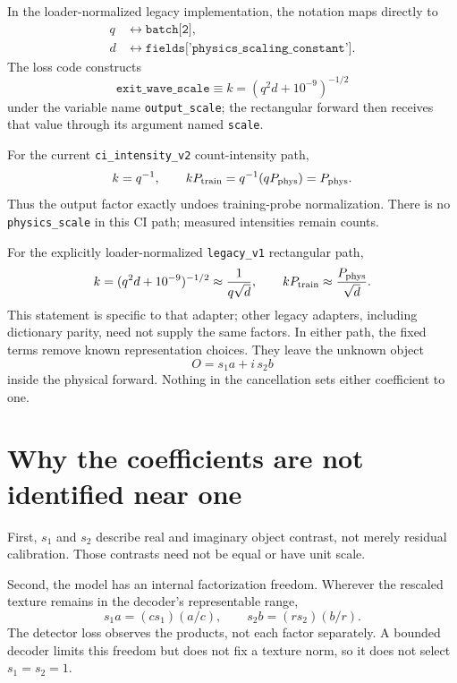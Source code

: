 \documentclass[10pt]{article}
\begin{document}
In the loader-normalized legacy implementation, the notation maps directly to
\begin{align*}
  q &\longleftrightarrow \texttt{batch[2]},\\
  d &\longleftrightarrow
      \texttt{fields['physics\_scaling\_constant']}.
\end{align*}
The loss code constructs
\begin{equation}
  \texttt{exit\_wave\_scale}
  \equiv k=(q^2d+10^{-9})^{-1/2}
\end{equation}
under the variable name \texttt{output\_scale}; the rectangular forward then
receives that value through its argument named \texttt{scale}.

For the current \texttt{ci\_intensity\_v2} count-intensity path,
\begin{equation}
  k=q^{-1}, \qquad kP_{\rm train}=q^{-1}(qP_{\rm phys})=P_{\rm phys}.
\end{equation}
Thus the output factor exactly undoes training-probe normalization. There is no
\texttt{physics\_scale} in this CI path; measured intensities remain counts.

For the explicitly loader-normalized \texttt{legacy\_v1} rectangular path,
\begin{equation}
  k=(q^2d+10^{-9})^{-1/2}
  \approx \frac{1}{q\sqrt d},
  \qquad kP_{\rm train}\approx\frac{P_{\rm phys}}{\sqrt d}.
\end{equation}
This statement is specific to that adapter; other legacy adapters, including
dictionary parity, need not supply the same factors. In either path, the fixed
terms remove known representation choices. They leave the unknown object
\begin{equation}
  O=s_1a+i\,s_2b
\end{equation}
inside the physical forward. Nothing in the cancellation sets either
coefficient to one.

\section*{Why the coefficients are not identified near one}

First, $s_1$ and $s_2$ describe real and imaginary object contrast, not merely
residual calibration. Those contrasts need not be equal or have unit scale.

Second, the model has an internal factorization freedom. Wherever the rescaled
texture remains in the decoder's representable range,
\begin{equation}
  s_1a=(cs_1)(a/c), \qquad
  s_2b=(rs_2)(b/r).
\end{equation}
The detector loss observes the products, not each factor separately. A bounded
decoder limits this freedom but does not fix a texture norm, so it does not
select $s_1=s_2=1$.
\end{document}
